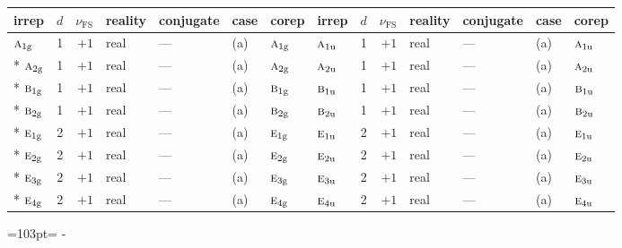 \documentclass[10pt,a4paper]{article}
\newcommand{\needspace}[1]{\par\penalty-100\begingroup\dimen0=#1\relax\dimen2=\pagegoal
  \advance\dimen2-\pagetotal\ifdim\dimen0>\dimen2\relax\ifdim\dimen2>0pt\vfil\break\fi\fi
  \endgroup}
\numberwithin{equation}{section}
\newcommand{\irr}[1]{\text{\normalfont\scshape #1}}
\newcommand{\ptag}[1]{\mathrm{#1}}
\newcommand{\fsind}{\nu_{\mathrm{FS}}}
\begin{document}
{\small\renewcommand{\arraystretch}{1.25}\setlength{\tabcolsep}{4pt}\begin{longtable}{@{}lrrllll@{\hspace{18pt}}lrrllll@{}}\toprule
irrep & $d$ & $\fsind$ & reality & conjugate & case & corep & irrep & $d$ & $\fsind$ & reality & conjugate & case & corep\\\midrule\endhead
\bottomrule\endfoot\endlastfoot
$\irr{a}_{1\ptag{g}}$ & 1 & $+1$ & real & --- & (a) & $\irr{a}_{1\ptag{g}}$ & $\irr{a}_{1\ptag{u}}$ & 1 & $+1$ & real & --- & (a) & $\irr{a}_{1\ptag{u}}$\\*
$\irr{a}_{2\ptag{g}}$ & 1 & $+1$ & real & --- & (a) & $\irr{a}_{2\ptag{g}}$ & $\irr{a}_{2\ptag{u}}$ & 1 & $+1$ & real & --- & (a) & $\irr{a}_{2\ptag{u}}$\\*
$\irr{b}_{1\ptag{g}}$ & 1 & $+1$ & real & --- & (a) & $\irr{b}_{1\ptag{g}}$ & $\irr{b}_{1\ptag{u}}$ & 1 & $+1$ & real & --- & (a) & $\irr{b}_{1\ptag{u}}$\\*
$\irr{b}_{2\ptag{g}}$ & 1 & $+1$ & real & --- & (a) & $\irr{b}_{2\ptag{g}}$ & $\irr{b}_{2\ptag{u}}$ & 1 & $+1$ & real & --- & (a) & $\irr{b}_{2\ptag{u}}$\\*
$\irr{e}_{1\ptag{g}}$ & 2 & $+1$ & real & --- & (a) & $\irr{e}_{1\ptag{g}}$ & $\irr{e}_{1\ptag{u}}$ & 2 & $+1$ & real & --- & (a) & $\irr{e}_{1\ptag{u}}$\\*
$\irr{e}_{2\ptag{g}}$ & 2 & $+1$ & real & --- & (a) & $\irr{e}_{2\ptag{g}}$ & $\irr{e}_{2\ptag{u}}$ & 2 & $+1$ & real & --- & (a) & $\irr{e}_{2\ptag{u}}$\\*
$\irr{e}_{3\ptag{g}}$ & 2 & $+1$ & real & --- & (a) & $\irr{e}_{3\ptag{g}}$ & $\irr{e}_{3\ptag{u}}$ & 2 & $+1$ & real & --- & (a) & $\irr{e}_{3\ptag{u}}$\\*
$\irr{e}_{4\ptag{g}}$ & 2 & $+1$ & real & --- & (a) & $\irr{e}_{4\ptag{g}}$ & $\irr{e}_{4\ptag{u}}$ & 2 & $+1$ & real & --- & (a) & $\irr{e}_{4\ptag{u}}$\\
\bottomrule\end{longtable}}
\needspace{103pt}
\end{document}
